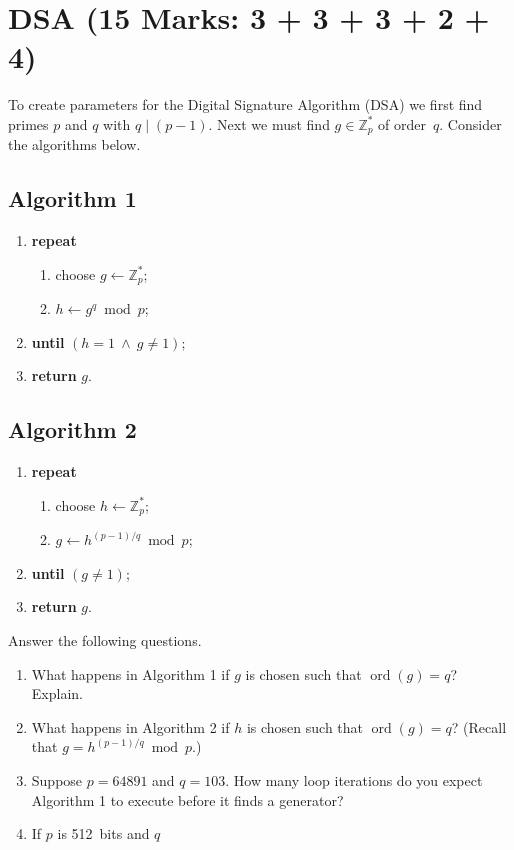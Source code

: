 \documentclass[12pt]{article}
\newcommand{\Z}{\mathbb{Z}}
\newcommand{\Zp}{\Z_p^{\ast}}
\begin{document}
\section{DSA \hfill (15 Marks: 3 + 3 + 3 + 2 + 4)}

To create parameters for the Digital Signature Algorithm (DSA) we first find primes $p$ and $q$ with $q \mid (p - 1)$.  Next we must find $g \in \Zp$ of order~$q$.  Consider the algorithms below.

\subsection*{Algorithm 1}
\begin{enumerate}[label=\arabic*.]
    \item \textbf{repeat}
    \begin{enumerate}[label=\alph*.]
        \item choose $g \leftarrow \Zp$;
        \item $h \gets g^{q} \bmod p$;
    \end{enumerate}
    \item \textbf{until} $(h = 1 \ \land\ g \neq 1)$;
    \item \textbf{return} $g$.
\end{enumerate}

\subsection*{Algorithm 2}
\begin{enumerate}[label=\arabic*.]
    \item \textbf{repeat}
    \begin{enumerate}[label=\alph*.]
        \item choose $h \leftarrow \Zp$;
        \item $g \gets h^{(p-1)/q} \bmod p$;
    \end{enumerate}
    \item \textbf{until} $(g \neq 1)$;
    \item \textbf{return} $g$.
\end{enumerate}

Answer the following questions.
\begin{enumerate}[label=\arabic*.]
    \item What happens in Algorithm 1 if $g$ is chosen such that $\operatorname{ord}(g) = q$? Explain.
    \item What happens in Algorithm 2 if $h$ is chosen such that $\operatorname{ord}(g) = q$? (Recall that $g = h^{(p-1)/q} \bmod p$.)
    \item Suppose $p = 64891$ and $q = 103$.  How many loop iterations do you expect Algorithm 1 to execute before it finds a generator?
    \item If $p$ is 512~bits and $q$
\end{enumerate}
\end{document}
